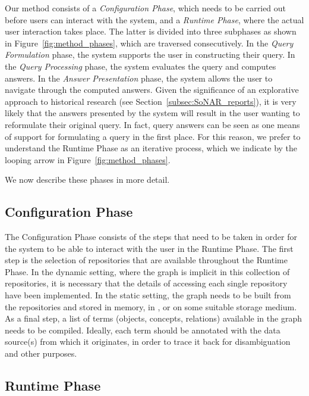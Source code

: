 Our method consists of a \emph{Configuration Phase}, which
needs to be carried out before users can interact with the system,
and a \emph{Runtime Phase}, where the actual user interaction takes place.
The latter is divided into three subphases as shown in Figure~\ref{fig:method_phases},
which are traversed consecutively.
In the \emph{Query Formulation} phase, the system supports the user 
in constructing their query.
In the \emph{Query Processing} phase, the system evaluates the query
and computes answers.
In the \emph{Answer Presentation} phase, the system allows the user to
navigate through the computed answers.
Given the significance of an explorative approach to historical research
(see Section~\ref{subsec:SoNAR_reports}),
it is very likely that the answers presented by the system will 
result in the user wanting to reformulate their original query.
In fact, query answers can be seen as one means of support
for formulating a query in the first place.
For this reason, we prefer to understand the Runtime Phase as an iterative process,
which we indicate by the looping arrow in Figure~\ref{fig:method_phases}.

We now describe these phases in more detail.

\subsection{Configuration Phase}

The Configuration Phase consists of the steps that need to be taken
in order for the system to be able to interact with the user in the Runtime Phase.
The first step is the selection of repositories that are available 
throughout the Runtime Phase.
In the dynamic setting, where the graph is implicit in this collection of repositories,
it is necessary that the details of accessing each single repository
have been implemented.
In the static setting, the graph needs to be built from the repositories
and stored in memory, in , or on some suitable storage medium.
As a final step, a list of terms (objects, concepts, relations) available in the graph
needs to be compiled. Ideally, each term should be annotated with the data source(s)
from which it originates, in order to trace it back for disambiguation and
other purposes.

\subsection{Runtime Phase}

